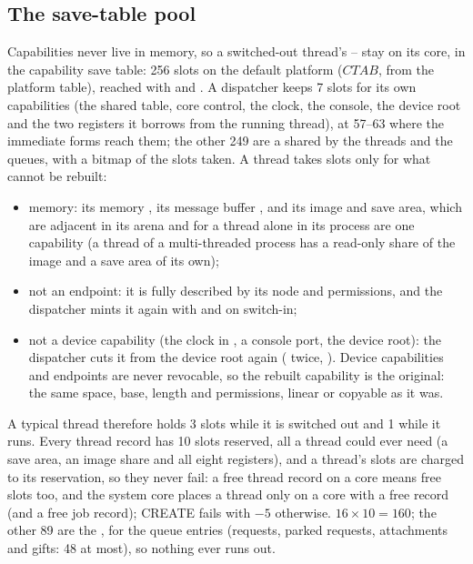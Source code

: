 \subsection{The save-table pool}\label{sec:os-pool}

Capabilities never live in memory, so a switched-out thread's -- stay on its core, in
the capability save table: 256 slots on the default platform ($\textit{CTAB}$, from the platform
table), reached with  and . A dispatcher keeps 7 slots for its own
capabilities (the shared table, core control, the clock, the console, the device root and the two
registers it borrows from the running thread), at 57--63 where the immediate forms reach them; the
other 249 are a  shared by the threads and the queues, with a bitmap of the slots taken. A
thread takes slots only for what cannot be rebuilt:
\begin{itemize}
\item memory: its memory , its message buffer , and its image and save area, which
  are adjacent in its arena and for a thread alone in its process are one capability (a thread of a
  multi-threaded process has a read-only share of the image and a save area of its own);
\item not an endpoint: it is fully described by its node and permissions, and the dispatcher mints
  it again with  and  on switch-in;
\item not a device capability (the clock in , a console port, the device root): the dispatcher
  cuts it from the device root again ( twice, ). Device capabilities and
  endpoints are never revocable, so the rebuilt capability is the original: the same space, base,
  length and permissions, linear or copyable as it was.
\end{itemize}
A typical thread therefore holds 3 slots while it is switched out and 1 while it runs. Every thread
record has 10 slots reserved, all a thread could ever need (a save area, an image share and all eight
registers), and a thread's slots are charged to its reservation, so they never fail: a free thread
record on a core means free slots too, and the system core places a thread only on a core with a free
record (and a free job record); CREATE fails with $-5$ otherwise. $16 \times 10 = 160$; the other 89
are the , for the queue entries (requests, parked requests, attachments and gifts:
48 at most), so nothing ever runs out.

